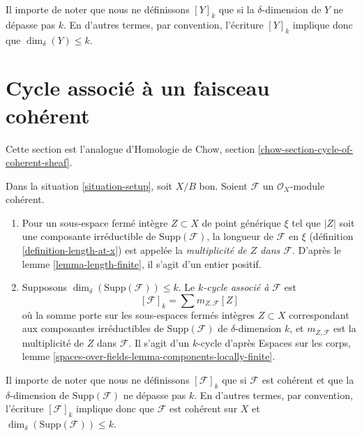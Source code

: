 \noindent
Il importe de noter que nous ne définissons $[Y]_k$ que si la
$\delta$-dimension de $Y$ ne dépasse pas $k$. En d’autres termes, par
convention, l'écriture $[Y]_k$ implique donc que $\dim_\delta(Y) \leq
k$.







\section{Cycle associé à un faisceau cohérent}
\label{section-cycle-of-coherent-sheaf}

\noindent
Cette section est l'analogue d'Homologie de Chow, section
\ref{chow-section-cycle-of-coherent-sheaf}.

\begin{definition}
\label{definition-cycle-associated-to-coherent-sheaf}
Dans la situation \ref{situation-setup}, soit $X/B$ bon. Soient
$\mathcal{F}$ un $\mathcal{O}_X$-module cohérent.
\begin{enumerate}
\item Pour un sous-espace fermé intègre $Z \subset X$ de point générique
$\xi$ tel que $|Z|$ soit une composante irréductible de
$\text{Supp}(\mathcal{F})$, la longueur de $\mathcal{F}$ en $\xi$ (définition
\ref{definition-length-at-x}) est appelée la {\it multiplicité de $Z$ dans
$\mathcal{F}$}. D'après le lemme \ref{lemma-length-finite}, il s'agit d'un
entier positif.
\item Supposons $\dim_\delta(\text{Supp}(\mathcal{F})) \leq k$. Le {\it
$k$-cycle associé à $\mathcal{F}$} est
$$
[\mathcal{F}]_k = \sum m_{Z, \mathcal{F}}[Z]
$$
où la somme porte sur les sous-espaces fermés intègres $Z \subset X$
correspondant aux composantes irréductibles de $\text{Supp}(\mathcal{F})$ de
$\delta$-dimension $k$, et $m_{Z, \mathcal{F}}$ est la multiplicité de $Z$
dans $\mathcal{F}$. Il s'agit d'un $k$-cycle d'après Espaces sur les corps, lemme
\ref{spaces-over-fields-lemma-components-locally-finite}.
\end{enumerate}
\end{definition}

\noindent
Il importe de noter que nous ne définissons $[\mathcal{F}]_k$ que si
$\mathcal{F}$ est cohérent et que la $\delta$-dimension de
$\text{Supp}(\mathcal{F})$ ne dépasse pas $k$. En d’autres termes, par
convention, l'écriture $[\mathcal{F}]_k$ implique donc que
$\mathcal{F}$ est cohérent sur $X$ et $\dim_\delta(\text{Supp}(\mathcal{F}))
\leq k$.

